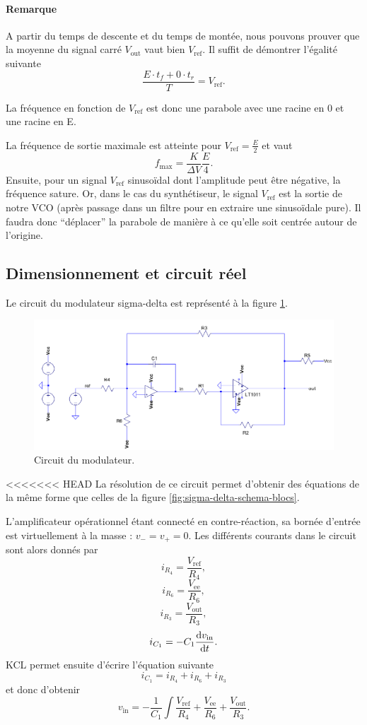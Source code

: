 \paragraph{Remarque}
A partir du temps de descente et du temps de montée, nous
pouvons prouver que la moyenne du signal carré $V_{\text{out}}$
vaut bien $V_{\text{ref}}$. Il suffit de démontrer l'égalité
suivante
\[ \frac{E \cdot t_f + 0 \cdot t_r}{T} = V_{\text{ref}}.\]

La fréquence en fonction de $V_{\text{ref}}$ est donc
une parabole avec une racine en \unit{0}{\volt} et une
racine en \unit{E}{\volt}.

La fréquence de sortie maximale est atteinte pour 
$V_{\text{ref}} = \frac{E}{2}$ et vaut
\[ f_{\text{max}} = \frac{K}{\Delta V}\frac{E}{4}. \]
Ensuite, pour un signal $V_{\text{ref}}$ sinusoïdal dont
l'amplitude peut être négative, la fréquence sature.
Or, dans le cas du synthétiseur, le signal $V_{\text{ref}}$
est la sortie de notre VCO (après passage dans un filtre pour
en extraire une sinusoïdale pure).
Il faudra donc ``déplacer'' la parabole de manière à ce qu'elle soit
centrée autour de l'origine.

\subsection{Dimensionnement et circuit réel}
Le circuit du modulateur sigma-delta est représenté
à la figure \ref{fig:sigma-delta-circuit}.

\begin{figure}[ht]
	\centering
	\includegraphics[scale=0.7]{img/sigma-delta-circuit.png}
	\caption{Circuit du modulateur.}
	\label{fig:sigma-delta-circuit}
\end{figure}

<<<<<<< HEAD
La résolution de ce circuit permet d'obtenir des équations
de la même forme que celles de la figure
\ref{fig:sigma-delta-schema-blocs}.

L'amplificateur opérationnel étant connecté en contre-réaction,
sa bornée d'entrée est virtuellement à la masse : $v_- = v_+ = 0$.
Les différents courants dans le circuit sont alors donnés par
\[ i_{R_4} = \frac{V_{\text{ref}}}{R_4},\]
\[ i_{R_6} = \frac{V_{\text{ee}}}{R_6},\]
\[ i_{R_3} = \frac{V_{\text{out}}}{R_3},\]
\[ i_{C_1} = -C_1\frac{\operatorname{d}\! v_{\text{in}}}{\operatorname{d}\! t}.\]
KCL permet ensuite d'écrire l'équation suivante
\[ i_{C_1} = i_{R_4} + i_{R_6} + i_{R_3}\]
et donc d'obtenir
\[ v_{\text{in}} = -\frac{1}{C_1}\int \frac{V_{\text{ref}}}{R_4}
+ \frac{V_{\text{ee}}}{R_6} + \frac{V_{\text{out}}}{R_3}.\]


